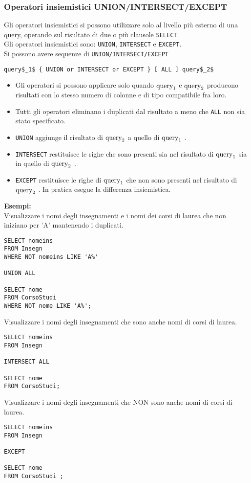 \documentclass[a4paper, 10pt]{article}
\begin{document}
	\subsubsection{Operatori insiemistici UNION/INTERSECT/EXCEPT}
		Gli operatori insiemistici si possono utilizzare solo al livello più esterno
		di una query, operando sul risultato di due o più clausole \lstinline|SELECT|.\\
		Gli operatori insiemistici sono: \lstinline|UNION|, \lstinline|INTERSECT| e \lstinline|EXCEPT|.\\
		Si possono avere sequenze di \lstinline|UNION/INTERSECT/EXCEPT|
		\begin{lstlisting}[mathescape]
query$_1$ { UNION or INTERSECT or EXCEPT } [ ALL ] query$_2$
		\end{lstlisting}
		\begin{itemize}
				\item Gli operatori si possono applicare solo quando $ \textup{query}_1 $ e 
				$ \textup{query}_2 $ producono risultati con lo stesso numero di colonne e di tipo compatibile
				fra loro.
				\item Tutti gli operatori eliminano i duplicati dal risultato a meno che \lstinline|ALL| non
				sia stato specificato.
				\item \lstinline|UNION| aggiunge il risultato di $ \textup{query}_2 $ a quello di 
				$ \textup{query}_1 $ .
				\item \lstinline|INTERSECT| restituisce le righe che sono presenti sia nel risultato di
				$ \textup{query}_1 $ sia in quello di $ \textup{query}_2 $ .
				\item \lstinline|EXCEPT| restituisce le righe di $ \textup{query}_1 $ che non sono presenti nel risultato
				di $ \textup{query}_2 $ . In pratica esegue la differenza insiemistica.
			\end{itemize}
		\noindent
		\textbf{Esempi: }\\
		Visualizzare i nomi degli insegnamenti e i nomi dei corsi di laurea che non
		iniziano per ’A’ mantenendo i duplicati.
		\begin{lstlisting}
SELECT nomeins
FROM Insegn
WHERE NOT nomeins LIKE 'A%'

UNION ALL

SELECT nome
FROM CorsoStudi
WHERE NOT nome LIKE 'A%';
		\end{lstlisting}
		Visualizzare i nomi degli insegnamenti che sono anche nomi di corsi di
		laurea.
		\begin{lstlisting}
SELECT nomeins
FROM Insegn

INTERSECT ALL

SELECT nome
FROM CorsoStudi;
		\end{lstlisting}
		Visualizzare i nomi degli insegnamenti che NON sono anche nomi di corsi di
		laurea.
		\begin{lstlisting}
SELECT nomeins
FROM Insegn

EXCEPT

SELECT nome
FROM CorsoStudi ;
		\end{lstlisting}
	
\end{document}
